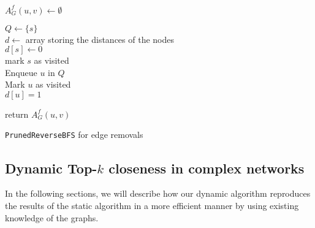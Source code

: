 \begin{algorithm2e}[h!]
 \label{alg:prunedReverseBFSRemovals}
   $A_G^f(u, v) \gets \emptyset$
   
   $Q \gets \{s\}$ \\
   $d \gets $ array storing the distances of the nodes \\
   $d[s] \gets 0$ \\
   mark $s$ as visited \\
   
   Enqueue $u$ in $Q$ \label{alg:addingAdditionalNeighbor} \\
   Mark $u$ as visited \\
   $d[u] = 1$ \label{alg:addingAdditionalNeighborEnd} \\
   
   
   return $A_G^f(u, v)$ 
   
 \caption{\texttt{PrunedReverseBFS} for edge removals}
\end{algorithm2e}



\subsection{Dynamic Top-$k$ closeness in complex networks}
\label{sec:dynamicTopKOptimizations}
In the following sections, we will describe how our dynamic algorithm reproduces the results of the static algorithm in a more efficient manner by using existing knowledge of the graphs.

